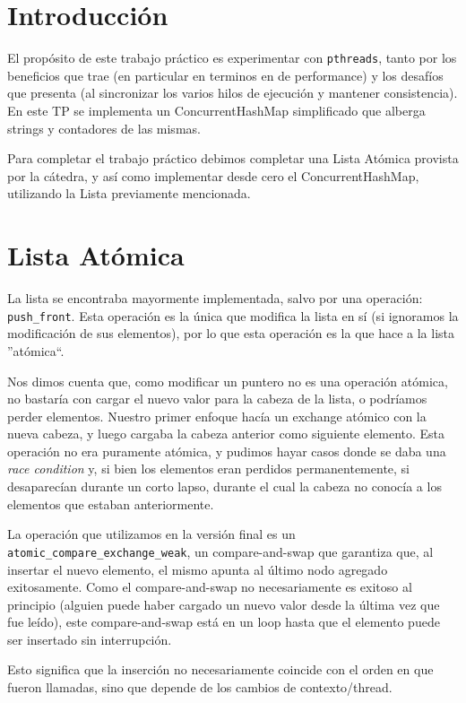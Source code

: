 \section{Introducción}

El propósito de este trabajo práctico es experimentar con \texttt{pthreads}, tanto por los beneficios que trae (en particular en terminos en de performance) y los desafíos que presenta (al sincronizar los varios hilos de ejecución y mantener consistencia). En este TP se implementa un ConcurrentHashMap simplificado que alberga strings y contadores de las mismas.

Para completar el trabajo práctico debimos completar una Lista Atómica provista por la cátedra, y así como implementar desde cero el ConcurrentHashMap, utilizando la Lista previamente mencionada.

\section{Lista Atómica}

La lista se encontraba mayormente implementada, salvo por una operación: \texttt{push\_front}. Esta operación es la única que modifica la lista en sí (si ignoramos la modificación de sus elementos), por lo que esta operación es la que hace a la lista ''atómica``.

Nos dimos cuenta que, como modificar un puntero no es una operación atómica, no bastaría con cargar el nuevo valor para la cabeza de la lista, o podríamos perder elementos. Nuestro primer enfoque hacía un exchange atómico con la nueva cabeza, y luego cargaba la cabeza anterior como siguiente elemento. Esta operación no era puramente atómica, y pudimos hayar casos donde se daba una \textit{race condition} y, si bien los elementos eran perdidos permanentemente, si desaparecían durante un corto lapso, durante el cual la cabeza no conocía a los elementos que estaban anteriormente.

La operación que utilizamos en la versión final es un \texttt{atomic\_compare\_exchange\_weak}, un compare-and-swap que garantiza que, al insertar el nuevo elemento, el mismo apunta al último nodo agregado exitosamente. Como el compare-and-swap no necesariamente es exitoso al principio (alguien puede haber cargado un nuevo valor desde la última vez que fue leído), este compare-and-swap está en un loop hasta que el elemento puede ser insertado sin interrupción.

Esto significa que la inserción no necesariamente coincide con el orden en que fueron llamadas, sino que depende de los cambios de contexto/thread.

